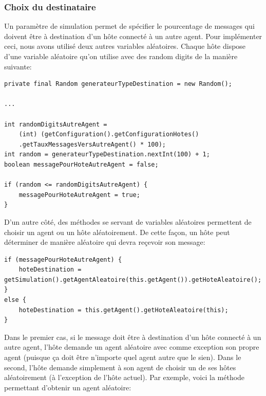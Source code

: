 \documentclass[a4paper,11pt]{article}
\begin{document}
\subsubsection*{Choix du destinataire}
Un paramètre de simulation permet de spécifier le pourcentage de messages qui doivent être à destination d'un hôte connecté à un autre agent. Pour implémenter ceci, nous avons utilisé deux autres variables aléatoires. Chaque hôte dispose d'une variable aléatoire qu'on utilise avec des random digits de la manière suivante:

\begin{lstlisting}[caption=Choix du type de destinataire d'un message]
private final Random generateurTypeDestination = new Random();

...

int randomDigitsAutreAgent =
	(int) (getConfiguration().getConfigurationHotes()
	.getTauxMessagesVersAutreAgent() * 100);
int random = generateurTypeDestination.nextInt(100) + 1;
boolean messagePourHoteAutreAgent = false;

if (random <= randomDigitsAutreAgent) {
	messagePourHoteAutreAgent = true;
}
\end{lstlisting}










\clearpage

D'un autre côté, des méthodes se servant de variables aléatoires permettent de choisir un agent ou un hôte aléatoirement. De cette façon, un hôte peut déterminer de manière aléatoire qui devra reçevoir son message:

\begin{lstlisting}[caption=Hote - Choix de la destination]
if (messagePourHoteAutreAgent) {
	hoteDestination = getSimulation().getAgentAleatoire(this.getAgent()).getHoteAleatoire();
}
else {
	hoteDestination = this.getAgent().getHoteAleatoire(this);
}
\end{lstlisting}




\clearpage

Dans le premier cas, si le message doit être à destination d'un hôte connecté à un autre agent, l'hôte demande un agent aléatoire avec comme exception son propre agent (puisque ça doit être n'importe quel agent autre que le sien). Dans le second, l'hôte demande simplement à son agent de choisir un de ses hôtes aléatoirement (à l'exception de l'hôte actuel). Par exemple, voici la méthode permettant d'obtenir un agent aléatoire:
\end{document}
